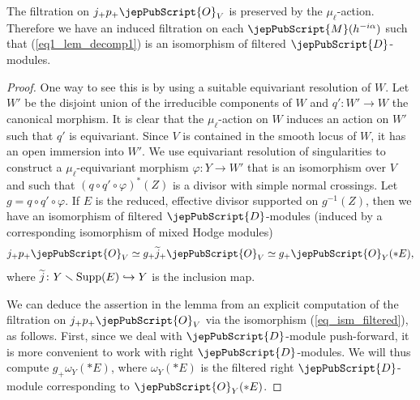 \begin{lemma}\label{decomp_filtration}
The filtration on $j_+p_+\jepPubScript{O}_V$ is preserved by the $\mu_{\ell}$-action. Therefore we have an induced filtration on each 
$\jepPubScript{M}(h^{-i\alpha})$ such that (\ref{eq1_lem_decomp1}) is an isomorphism of filtered $\jepPubScript{D}$-modules.
\end{lemma}


\begin{proof}
One way to see this is by using a suitable equivariant resolution of $W$. Let $W'$ be the disjoint union of the irreducible components of $W$ and
$q'\colon W'\to W$ the canonical morphism. It is clear that the $\mu_{\ell}$-action on $W$ induces an action on $W'$ such that $q'$ is equivariant.
Since $V$ is contained in the smooth locus of $W$, it has an open immersion into $W'$. 
We use equivariant resolution of singularities to construct a $\mu_{\ell}$-equivariant morphism 
$\varphi\colon Y\to W'$ that is an isomorphism over $V$ and such that $(q\circ q'\circ\varphi)^*(Z)$ is a divisor with simple normal crossings.  
Let $g=q\circ q'\circ \varphi$. If $E$ is the reduced, effective divisor supported on $g^{-1}(Z)$, then 
we have an isomorphism of filtered $\jepPubScript{D}$-modules (induced by a corresponding isomorphism of mixed Hodge modules)
\begin{equation}\label{eq_ism_filtered}
j_+p_+\jepPubScript{O}_V\simeq g_+\widetilde{j}_+\jepPubScript{O}_V\simeq g_+\jepPubScript{O}_Y(*E),
\end{equation}
where $\widetilde{j}\colon Y\smallsetminus {\rm Supp}(E)\hookrightarrow Y$ is the inclusion map.

We can deduce the assertion in the lemma from an explicit
computation of the filtration on $j_+p_+\jepPubScript{O}_V$ via the isomorphism (\ref{eq_ism_filtered}), as follows. First, since we deal with
$\jepPubScript{D}$-module push-forward, it is more convenient to work with right $\jepPubScript{D}$-modules. We will thus compute $g_+\omega_Y(*E)$, where
$\omega_Y(*E)$ is the filtered right $\jepPubScript{D}$-module corresponding to $\jepPubScript{O}_Y(*E)$. 


\end{proof}

